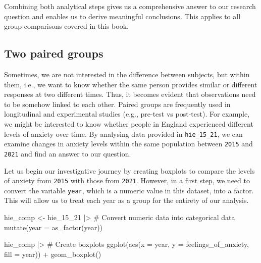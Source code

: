 \documentclass[
  letterpaper,
  DIV=11,
  numbers=noendperiod]{scrreprt}
\newenvironment{Shaded}{\begin{snugshade}}{\end{snugshade}}
\newcommand{\AttributeTok}[1]{\textcolor[rgb]{0.40,0.45,0.13}{#1}}
\newcommand{\CommentTok}[1]{\textcolor[rgb]{0.37,0.37,0.37}{#1}}
\newcommand{\FunctionTok}[1]{\textcolor[rgb]{0.28,0.35,0.67}{#1}}
\newcommand{\NormalTok}[1]{\textcolor[rgb]{0.00,0.23,0.31}{#1}}
\newcommand{\OtherTok}[1]{\textcolor[rgb]{0.00,0.23,0.31}{#1}}
\newcommand{\SpecialCharTok}[1]{\textcolor[rgb]{0.37,0.37,0.37}{#1}}
\begin{document}
Combining both analytical steps gives us a comprehensive answer to our
research question and enables us to derive meaningful conclusions. This
applies to all group comparisons covered in this book.

\subsection{Two paired groups}\label{sec-two-paired-groups}

Sometimes, we are not interested in the difference between subjects, but
within them, i.e., we want to know whether the same person provides
similar or different responses at two different times. Thus, it becomes
evident that observations need to be somehow linked to each other.
Paired groups are frequently used in longitudinal and experimental
studies (e.g., pre-test vs post-test). For example, we might be
interested to know whether people in England experienced different
levels of anxiety over time. By analysing data provided in
\texttt{hie\_15\_21}, we can examine changes in anxiety levels within
the same population between \texttt{2015} and \texttt{2021} and find an
answer to our question.

Let us begin our investigative journey by creating boxplots to compare
the levels of anxiety from \texttt{2015} with those from \texttt{2021}.
However, in a first step, we need to convert the variable \texttt{year},
which is a numeric value in this dataset, into a factor. This will allow
us to treat each year as a group for the entirety of our analysis.

\begin{Shaded}
\begin{Highlighting}[]
\NormalTok{hie\_comp }\OtherTok{\textless{}{-}}
\NormalTok{  hie\_15\_21 }\SpecialCharTok{|\textgreater{}}
  \CommentTok{\# Convert numeric data into categorical data}
  \FunctionTok{mutate}\NormalTok{(}\AttributeTok{year =} \FunctionTok{as\_factor}\NormalTok{(year))}

\NormalTok{hie\_comp }\SpecialCharTok{|\textgreater{}}  
  \CommentTok{\# Create boxplots}
  \FunctionTok{ggplot}\NormalTok{(}\FunctionTok{aes}\NormalTok{(}\AttributeTok{x =}\NormalTok{ year,}
             \AttributeTok{y =}\NormalTok{ feelings\_of\_anxiety,}
             \AttributeTok{fill =}\NormalTok{ year)) }\SpecialCharTok{+}
  \FunctionTok{geom\_boxplot}\NormalTok{()}
\end{Highlighting}
\end{Shaded}
\end{document}
